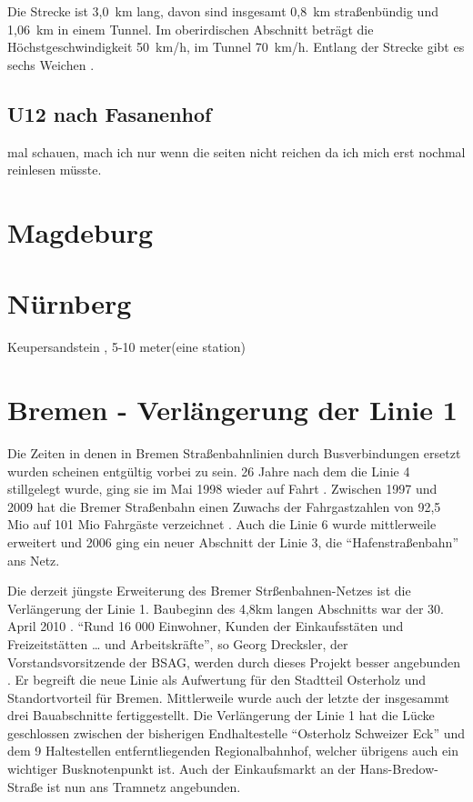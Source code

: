 Die Strecke ist 3,0{\ }km lang, davon sind insgesamt 0,8{\ }km straßenbündig und 1,06{\ }km in einem Tunnel.
Im oberirdischen Abschnitt beträgt die Höchst\-gesch\-windig\-keit 50{\ }km/h, im Tunnel 70{\ }km/h.
Entlang der Strecke gibt es sechs Weichen \cite{u15mail}.

\subsection*{U12 nach Fasanenhof}

mal schauen, mach ich nur wenn die seiten nicht reichen da ich mich erst nochmal reinlesen müsste.


\section{Magdeburg}


\section{Nürnberg}

Keupersandstein , 5-10 meter(eine station) \cite{nbRef3} 

\section[Bremen]{Bremen - Verlängerung der Linie 1}

Die Zeiten in denen in Bremen Straßenbahnlinien durch Busverbindungen ersetzt wurden scheinen entgültig vorbei zu sein. 26 Jahre nach dem die Linie 4 stillgelegt wurde, ging sie im Mai 1998 wieder auf Fahrt \cite{bSv11}. Zwischen 1997 und 2009 hat die Bremer Straßenbahn einen Zuwachs der Fahrgastzahlen von 92,5 Mio auf 101 Mio Fahrgäste verzeichnet \cite{bNp10}. Auch die Linie 6 wurde mittlerweile erweitert und 2006 ging ein neuer Abschnitt der Linie 3, die ``Hafenstraßenbahn'' ans Netz. 

Die derzeit jüngste Erweiterung des Bremer Strßenbahnen-Netzes ist die Verlängerung der Linie 1. Baubeginn des 4,8km langen Abschnitts war der 30. April 2010 \cite{bNp10}. ``Rund 16 000 Einwohner, Kunden der Einkaufsstäten und Freizeitstätten {…} und Arbeitskräfte'', so Georg Drecksler, der Vorstandsvorsitzende der BSAG, werden durch dieses Projekt besser angebunden \cite{bNp10}. Er begreift die neue Linie als Aufwertung für den Stadtteil Osterholz und Standortvorteil für Bremen. Mittlerweile wurde auch der letzte der insgesammt drei Bauabschnitte\cite{bSv12} fertiggestellt. Die Verlängerung der Linie 1 hat die Lücke geschlossen zwischen der bisherigen Endhaltestelle ``Osterholz Schweizer Eck'' und dem 9 Haltestellen entferntliegenden Regionalbahnhof, welcher übrigens auch ein wichtiger Busknotenpunkt ist. Auch der Einkaufsmarkt an der Hans-Bredow-Straße ist nun ans Tramnetz angebunden.

